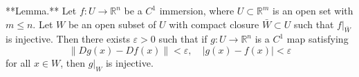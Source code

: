 **Lemma.** Let $f: U \to \mathbb{R}^n$ be a $C^1$ immersion, where $U \subset \mathbb{R}^m$ is an open set with $m \leq n$. Let $W$ be an open subset of $U$ with compact closure $\bar{W} \subset U$ such that $f|_{\bar{W}}$ is injective. Then there exists $\varepsilon > 0$ such that if $g: U \to \mathbb{R}^n$ is a $C^1$ map satisfying
$$\|Dg(x) - Df(x)\| < \varepsilon, \quad |g(x) - f(x)| < \varepsilon$$
for all $x \in W$, then $g|_W$ is injective.
